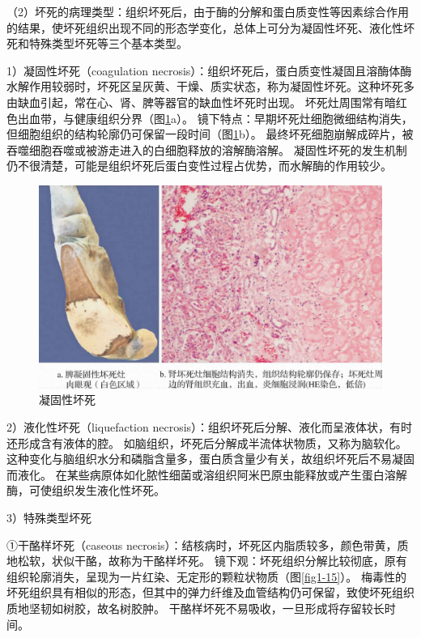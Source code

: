 （2）坏死的病理类型：组织坏死后，由于酶的分解和蛋白质变性等因素综合作用的结果，使坏死组织出现不同的形态学变化，总体上可分为凝固性坏死、液化性坏死和特殊类型坏死等三个基本类型。

1）凝固性坏死（coagulation
necrosis）：组织坏死后，蛋白质变性凝固且溶酶体酶水解作用较弱时，坏死区呈灰黄、干燥、质实状态，称为凝固性坏死。这种坏死多由缺血引起，常在心、肾、脾等器官的缺血性坏死时出现。
坏死灶周围常有暗红色出血带，与健康组织分界（图\ref{fig1-14}a）。
镜下特点：早期坏死灶细胞微细结构消失，但细胞组织的结构轮廓仍可保留一段时间（图\ref{fig1-14}b）。
最终坏死细胞崩解成碎片，被吞噬细胞吞噬或被游走进入的白细胞释放的溶解酶溶解。
凝固性坏死的发生机制仍不很清楚，可能是组织坏死后蛋白变性过程占优势，而水解酶的作用较少。

\begin{figure}[!htbp]
	\centering
	\includegraphics[width=.7\textwidth]{./images/Image00015.jpg}
	\caption{凝固性坏死}
	\label{fig1-14}
\end{figure}

2）液化性坏死（liquefaction
necrosis）：组织坏死后分解、液化而呈液体状，有时还形成含有液体的腔。
如脑组织，坏死后分解成半流体状物质，又称为脑软化。
这种变化与脑组织水分和磷脂含量多，蛋白质含量少有关，故组织坏死后不易凝固而液化。
在某些病原体如化脓性细菌或溶组织阿米巴原虫能释放或产生蛋白溶解酶，可使组织发生液化性坏死。

3）特殊类型坏死

①干酪样坏死（caseous
necrosis）：结核病时，坏死区内脂质较多，颜色带黄，质地松软，状似干酪，故称为干酪样坏死。
镜下观：坏死组织分解比较彻底，原有组织轮廓消失，呈现为一片红染、无定形的颗粒状物质（图\ref{fig1-15}）。
梅毒性的坏死组织具有相似的形态，但其中的弹力纤维及血管结构仍可保留，致使坏死组织质地坚韧如树胶，故名树胶肿。
干酪样坏死不易吸收，一旦形成将存留较长时间。

